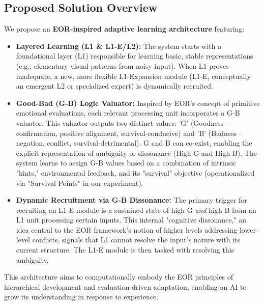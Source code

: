 \documentclass{article}
\begin{document}
\subsection{Proposed Solution Overview}
We propose an \textbf{EOR-inspired adaptive learning architecture} featuring:
\begin{itemize}
    \item \textbf{Layered Learning (L1 \& L1-E/L2):} The system starts with a foundational layer (L1) responsible for learning basic, stable representations (e.g., elementary visual patterns from noisy input). When L1 proves inadequate, a new, more flexible L1-Expansion module (L1-E, conceptually an emergent L2 or specialized expert) is dynamically recruited.
    \item \textbf{Good-Bad (G-B) Logic Valuator:} Inspired by EOR's concept of primitive emotional evaluations, each relevant processing unit incorporates a G-B valuator. This valuator outputs two distinct values: 'G' (Goodness – confirmation, positive alignment, survival-conducive) and 'B' (Badness – negation, conflict, survival-detrimental). G and B can co-exist, enabling the explicit representation of ambiguity or dissonance (High G and High B). The system learns to assign G-B values based on a combination of intrinsic "hints," environmental feedback, and its "survival" objective (operationalized via "Survival Points" in our experiment).
    \item \textbf{Dynamic Recruitment via G-B Dissonance:} The primary trigger for recruiting an L1-E module is a sustained state of high G \emph{and} high B from an L1 unit processing certain inputs. This internal "cognitive dissonance," an idea central to the EOR framework's notion of higher levels addressing lower-level conflicts, signals that L1 cannot resolve the input's nature with its current structure. The L1-E module is then tasked with resolving this ambiguity.
\end{itemize}
This architecture aims to computationally embody the EOR principles of hierarchical development and evaluation-driven adaptation, enabling an AI to grow its understanding in response to experience.
\end{document}
